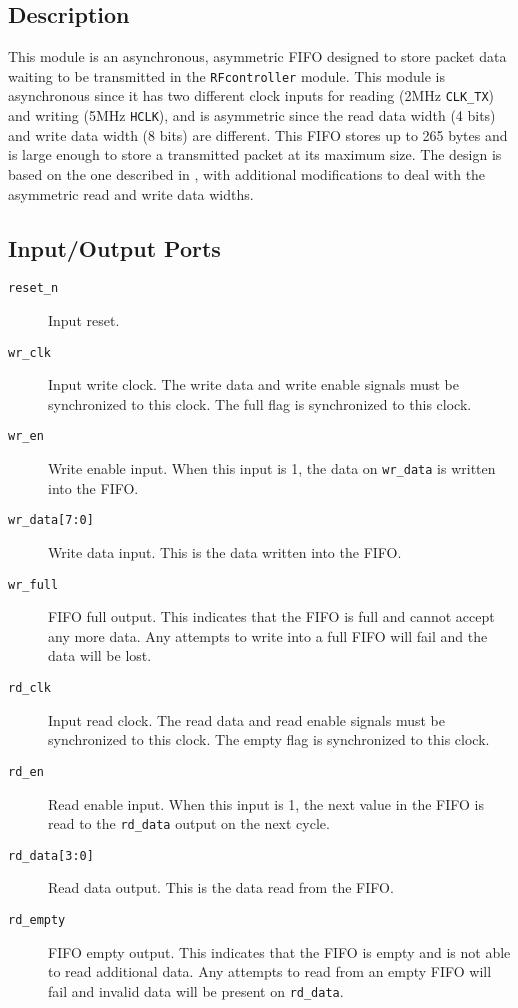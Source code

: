 \subsection{Description}
This module is an asynchronous, asymmetric FIFO designed to store packet data waiting to be transmitted in the \texttt{RFcontroller} module. This module is asynchronous since it has two different clock inputs for reading (2MHz \texttt{CLK\_TX}) and writing (5MHz \texttt{HCLK}), and is asymmetric since the read data width (4 bits) and write data width (8 bits) are different. This FIFO stores up to 265 bytes and is large enough to store a transmitted packet at its maximum size. The design is based on the one described in \cite{async-fifo}, with additional modifications to deal with the asymmetric read and write data widths.

\subsection{Input/Output Ports}
\begin{description}
	\item[\texttt{reset\_n}] Input reset.
	\item[\texttt{wr\_clk}] Input write clock. The write data and write enable signals must be synchronized to this clock. The full flag is synchronized to this clock.
	\item[\texttt{wr\_en}] Write enable input. When this input is 1, the data on \texttt{wr\_data} is written into the FIFO.
	\item[\texttt{wr\_data[7:0]}] Write data input. This is the data written into the FIFO.
	\item[\texttt{wr\_full}] FIFO full output. This indicates that the FIFO is full and cannot accept any more data. Any attempts to write into a full FIFO will fail and the data will be lost.
	\item[\texttt{rd\_clk}] Input read clock. The read data and read enable signals must be synchronized to this clock. The empty flag is synchronized to this clock.
	\item[\texttt{rd\_en}] Read enable input. When this input is 1, the next value in the FIFO is read to the \texttt{rd\_data} output on the next cycle.
	\item[\texttt{rd\_data[3:0]}] Read data output. This is the data read from the FIFO.
	\item[\texttt{rd\_empty}] FIFO empty output. This indicates that the FIFO is empty and is not able to read additional data. Any attempts to read from an empty FIFO will fail and invalid data will be present on \texttt{rd\_data}.
\end{description}

